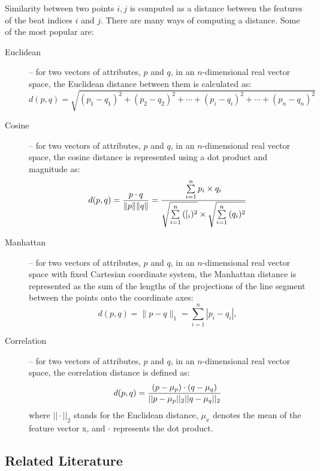 Similarity between two points $i, j$ is computed as a distance between the features of the beat indices $i$ and $j$. There are many ways of computing a distance. Some of the most popular are:
\begin{description}
\item[Euclidean] --  for two vectors of attributes, $p$ and $q$, in an $n$-dimensional real vector space, the Euclidean distance between them is calculated as:
\begin{equation}
d(p, q) = \sqrt{(p_1- q_1)^2 + (p_2 - q_2)^2+\cdots+(p_i - q_i)^2+\cdots+(p_n - q_n)^2}
\end{equation}
\item[Cosine] --  for two vectors of attributes, $p$ and $q$, in an $n$-dimensional real vector space, the cosine distance is represented using a dot product and magnitude as:
\begin{equation}
d(p, q) = {p \cdot q \over \|p\| \|q\|} = \frac{ \sum\limits_{i=1}^{n}{p_i \times q_i} }{ \sqrt{\sum\limits_{i=1}^{n}{([_i)^2}} \times \sqrt{\sum\limits_{i=1}^{n}{(q_i)^2}} }
\end{equation}
\item[Manhattan] --  for two vectors of attributes, $p$ and $q$, in an $n$-dimensional real vector space with fixed Cartesian coordinate system, the Manhattan distance is represented as the sum of the lengths of the projections of the line segment between the points onto the coordinate axes:
\begin{equation}
d(p, q) = \|p - q\|_1 = \sum_{i=1}^n |p_i-q_i|,
\end{equation}
\item[Correlation] --  for two vectors of attributes, $p$ and $q$, in an $n$-dimensional real vector space, the correlation distance is defined as:
\begin{equation}
d(p, q) =  {(p - \mu _{p}) \cdot (q - \mu _{q}) \over ||p -\mu _{p} ||_{2} ||q - \mu _{q}||_{2}}
\end{equation}
where $|| \cdot ||_{2}$ stands for the Euclidean distance, $\mu _{x}$ denotes the mean of the feature vector x, and $\cdot$ represents the dot product.
\end{description}

\vspace{10pt}


\vspace{10pt}

\subsection{Related Literature}

